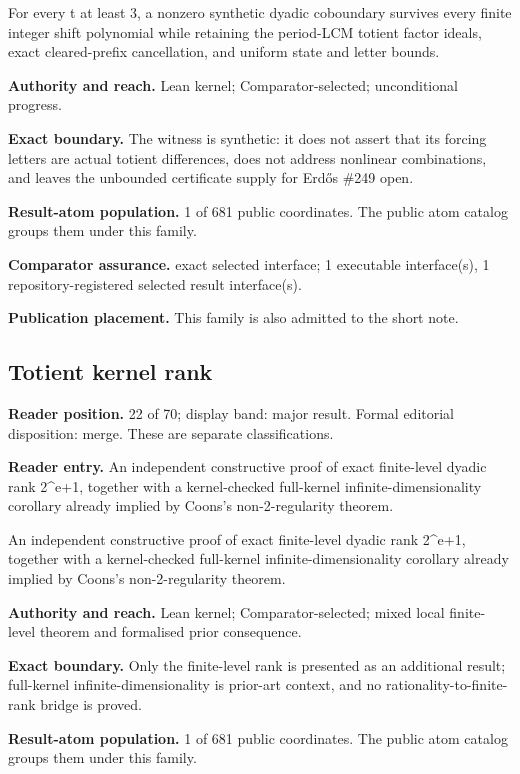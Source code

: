 For every t at least 3, a nonzero synthetic dyadic coboundary survives every finite integer shift polynomial while retaining the period-LCM totient factor ideals, exact cleared-prefix cancellation, and uniform state and letter bounds.

\textbf{Authority and reach.} Lean kernel; Comparator-selected; unconditional progress.

\textbf{Exact boundary.} The witness is synthetic: it does not assert that its forcing letters are actual totient differences, does not address nonlinear combinations, and leaves the unbounded certificate supply for Erdős \#249 open.

\textbf{Result-atom population.} 1 of 681 public coordinates. The public atom catalog groups them under this family.

\textbf{Comparator assurance.} exact selected interface; 1 executable interface(s), 1 repository-registered selected result interface(s).

\textbf{Publication placement.} This family is also admitted to the short note.

\subsection{Totient kernel rank}
\textbf{Reader position.} 22 of 70; display band: major result.  Formal editorial disposition: merge.  These are separate classifications.

\textbf{Reader entry.} An independent constructive proof of exact finite-level dyadic rank 2\textasciicircum{}e+1, together with a kernel-checked full-kernel infinite-dimensionality corollary already implied by Coons's non-2-regularity theorem.

An independent constructive proof of exact finite-level dyadic rank 2\textasciicircum{}e+1, together with a kernel-checked full-kernel infinite-dimensionality corollary already implied by Coons's non-2-regularity theorem.

\textbf{Authority and reach.} Lean kernel; Comparator-selected; mixed local finite-level theorem and formalised prior consequence.

\textbf{Exact boundary.} Only the finite-level rank is presented as an additional result; full-kernel infinite-dimensionality is prior-art context, and no rationality-to-finite-rank bridge is proved.

\textbf{Result-atom population.} 1 of 681 public coordinates. The public atom catalog groups them under this family.

